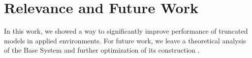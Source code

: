\documentclass{acm_proc_article-sp}
\begin{document}
\section{Relevance and Future Work}
In this work, we showed a way to significantly improve performance of truncated models in applied environments. For future work, we leave a theoretical analysis of the Base System and further optimization of its construction .

%

%
\end{document}
